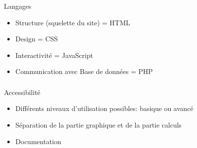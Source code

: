 \documentclass[11pt]{beamer}
\begin{document}
\begin{frame}
	\frametitle{\secname}
	\begin{block}{Langages}
		\begin{itemize}
		\item Structure (squelette du site) = HTML
\item Design = CSS
\item Interactivité = JavaScript
\item Communication avec Base de données = PHP

		\end{itemize}
	\end{block}
\end{frame}

\begin{frame}
	\frametitle{\secname}
	\begin{block}{Accessibilité}
	\begin{itemize}
	\item Différents niveaux d'utilisation possibles: basique ou avancé
	\item Séparation de la partie graphique et de la partie calculs
	\item Documentation
	\end{itemize}
	\end{block}
\end{frame}
\end{document}

